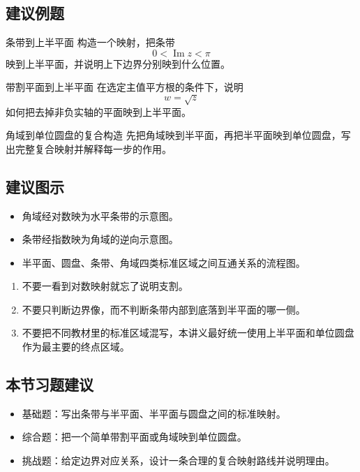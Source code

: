 \subsection*{建议例题}
\begin{lizi}{条带到上半平面}{}
构造一个映射，把条带
\[
    0<\operatorname{Im} z<\pi
\]
映到上半平面，并说明上下边界分别映到什么位置。
\end{lizi}

\begin{lizi}{带割平面到上半平面}{}
在选定主值平方根的条件下，说明
\[
    w=\sqrt{z}
\]
如何把去掉非负实轴的平面映到上半平面。
\end{lizi}

\begin{lizi}{角域到单位圆盘的复合构造}{}
先把角域映到半平面，再把半平面映到单位圆盘，写出完整复合映射并解释每一步的作用。
\end{lizi}

\subsection*{建议图示}
\begin{itemize}
    \item 角域经对数映为水平条带的示意图。
    \item 条带经指数映为角域的逆向示意图。
    \item 半平面、圆盘、条带、角域四类标准区域之间互通关系的流程图。
\end{itemize}

\begin{jinshi}[本节易错点]
\begin{enumerate}
    \item 不要一看到对数映射就忘了说明支割。
    \item 不要只判断边界像，而不判断条带内部到底落到半平面的哪一侧。
    \item 不要把不同教材里的标准区域混写，本讲义最好统一使用上半平面和单位圆盘作为最主要的终点区域。
\end{enumerate}
\end{jinshi}

\subsection*{本节习题建议}
\begin{itemize}
    \item 基础题：写出条带与半平面、半平面与圆盘之间的标准映射。
    \item 综合题：把一个简单带割平面或角域映到单位圆盘。
    \item 挑战题：给定边界对应关系，设计一条合理的复合映射路线并说明理由。
\end{itemize}

